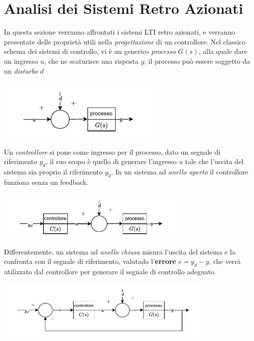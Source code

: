 \documentclass[10pt, letterpaper]{report}
\begin{document}
\section{Analisi dei Sistemi Retro Azionati}
 In questa sezione verranno affrontati i sistemi LTI retro azionati, e verranno presentate delle proprietà utili nella \textit{progettazione} di un controllore. \acc 
 Nel classico schema dei sistemi di controllo, vi è un generico \textit{processo} $G(s)$, alla quale dare un ingresso $u$, che ne scaturisce una risposta $y$, il processo può essere soggetto da un \textit{disturbo} $d$
 \begin{center}
    \includegraphics[width=0.6\textwidth ]{images/classicoControllo.pdf}
 \end{center}
Un \textit{controllore} si pone come ingresso per il processo, dato un segnale di riferimento $y_d$, il suo scopo è quello di generare l'ingresso $u$ tale che l'uscita del sistema sia proprio il riferimento $y_d$. In un sistema ad \textit{anello aperto} il controllore funziona senza un feedback.
\begin{center}
    \includegraphics[width=0.7\textwidth ]{images/classicoControllo2.pdf}
 \end{center}
Differentemente, un sistema ad \textit{anello chiusa} misura l'uscita del sistema e la confronta con il segnale di riferimento, valutado l'\textbf{errore} $e=y_d-y$, che verrà utilizzato dal controllore per generare il segnale di controllo adeguato.
\begin{center}
    \includegraphics[width=0.8\textwidth ]{images/classicoControllo3.pdf}
 \end{center}
\end{document}

